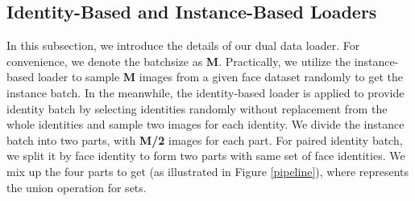 \subsection{Identity-Based and Instance-Based Loaders}\label{dual_loader}
In this subsection, we introduce the details of our dual data loader.
For convenience, we denote the batchsize as \textbf{M}.
Practically, we utilize the instance-based loader to sample \textbf{M} images from a given face dataset randomly to get the instance batch.
In the meanwhile, the identity-based loader is applied to provide identity batch by selecting  identities randomly without replacement from the whole identities and sample two images for each identity.
We divide the instance batch into two parts, with \textbf{M/2} images for each part.
For paired identity batch, we split it by face identity to form two parts with same set of face identities.
We mix up the four parts to get  (as illustrated in Figure \ref{pipeline}), where
 represents the union operation for sets. 

